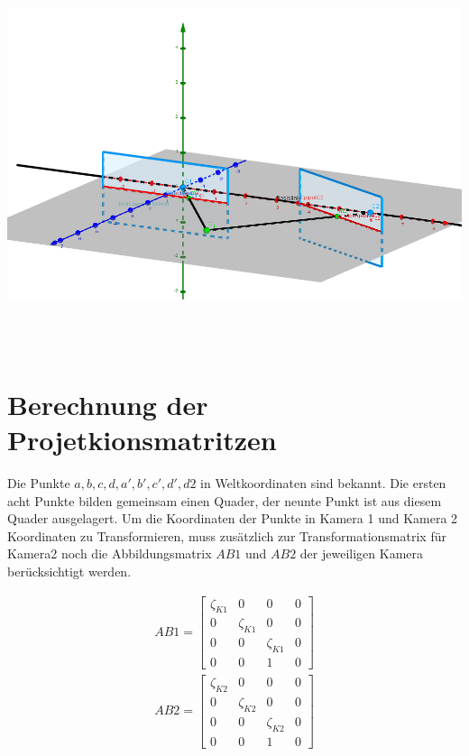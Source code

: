 \begin{minipage}{\linewidth}
	\centering
	\includegraphics[width=1.\linewidth]{images/3DAnsichSystem.png}
\end{minipage}\\ \\


\section{Berechnung der Projetkionsmatritzen}

Die Punkte \ensuremath{a,b,c,d,a',b',c',d',d2} in Weltkoordinaten sind bekannt. Die ersten acht Punkte bilden gemeinsam einen Quader, der neunte Punkt ist aus diesem Quader ausgelagert.	
Um die Koordinaten der Punkte in Kamera 1 und Kamera 2 Koordinaten zu Transformieren, muss zusätzlich zur Transformationsmatrix für Kamera2 noch die Abbildungsmatrix \ensuremath{AB1} und \ensuremath{AB2} der jeweiligen Kamera berücksichtigt werden. 

\begin{gather}		
AB1 =
\begin{bmatrix}
\zeta_{K1}&0&0&0\\
0&\zeta_{K1}&0&0\\
0&0&\zeta_{K1}&0\\
0&0&1&0
\end{bmatrix}\\
AB2 =
\begin{bmatrix}
\zeta_{K2}&0&0&0\\
0&\zeta_{K2}&0&0\\
0&0&\zeta_{K2}&0\\
0&0&1&0
\end{bmatrix}
\end{gather}

